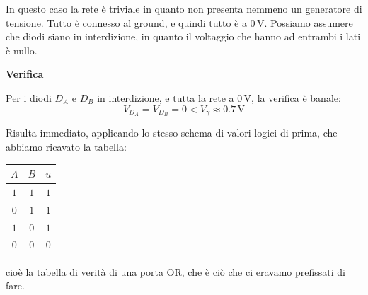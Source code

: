 \documentclass[a4paper,11pt]{article}
\begin{document}
\begin{itemize}
In questo caso la rete è triviale in quanto non presenta nemmeno un generatore di tensione. Tutto è connesso al ground, e quindi tutto è a $0 \, \mathrm{V}$. Possiamo assumere che diodi siano in interdizione, in quanto il voltaggio che hanno ad entrambi i lati è nullo.

\par\smallskip
\textbf{\textsf{Verifica}}

Per i diodi $D_A$ e $D_B$ in interdizione, e tutta la rete a $0 \, \mathrm{V}$, la verifica è banale:
$$
V_{D_A} = V_{D_B} = 0 < V_\gamma \approx 0.7 \, \mathrm{V} 
$$

\end{itemize}

Risulta immediato, applicando lo stesso schema di valori logici di prima, che abbiamo ricavato la tabella:
\begin{table}[H]
	\center 
	\begin{tabular} { c | c || c }
		$A$ & $B$ & $u$ \\
		\hline
		$1$ & $1$ & $1$ \\
		$0$ & $1$ & $1$ \\
		$1$ & $0$ & $1$ \\
		$0$ & $0$ & $0$ \\
	\end{tabular}
\end{table}
cioè la tabella di verità di una porta OR, che è ciò che ci eravamo prefissati di fare.
\end{document}
